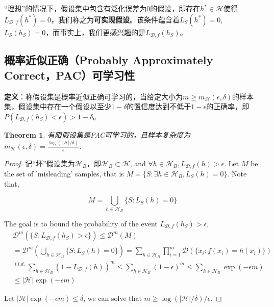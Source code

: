 \documentclass{article}
\newtheorem{theorem}{Theorem}
\newtheorem*{proof}{Proof}
\begin{document}
	“理想”的情况下，假设集中包含有泛化误差为0的假设，即存在$h^*\in\mathcal{H}$使得$L_{\mathcal{D},f}(h^*) = 0$，我们称之为\textbf{可实现假设}。该条件蕴含着$L_S(h^*)=0$, $L_S(h_S)=0$，而事实上，我们更感兴趣的是$L_{\mathcal{D},f}(h_S)$。

\subsection{概率近似正确（Probably Approximately Correct，PAC）可学习性}
	\textbf{定义}：称假设集是概率近似正确可学习的，当给定大小为$m\geq m_\mathcal{H}(\epsilon,\delta)$的样本集，假设集中存在一个假设以至少$1-\delta$的置信度达到不低于$1-\epsilon$的正确率，即$P(L_{\mathcal{D},f}(h_S) < \epsilon) > 1-\delta$。
	
	\begin{theorem} 有限假设集是PAC可学习的，且样本复杂度为$m_\mathcal{H}(\epsilon,\delta)=\frac{\log(|\mathcal{H}|/\delta)}{\epsilon}$.
	\end{theorem}
	
	\begin{proof}
	记“坏”假设集为$\mathcal{H}_B$，即$\mathcal{H}_B\subset\mathcal{H}$, and $\forall h\in\mathcal{H}_B,L_{\mathcal{D},f}(h)>\epsilon$. Let $M$ be the set of 'misleading' samples, that is $M=\{S:\exists h\in \mathcal{H}_B, L_S(h)=0\}$. Note that, 
	
	\begin{equation*}
	M=\bigcup\limits_{h\in\mathcal{H}_B}\{S:L_S(h)=0\}
	\end{equation*}
	
	The goal is to bound the probability of the event $L_{\mathcal{D},f}(h_S)>\epsilon$,
	\begin{equation*}
	\begin{split}
	&\mathcal{D}^m(\{S:L_{\mathcal{D},f}(h_S)>\epsilon\})\leq\mathcal{D}^m(M) \\
	&=\mathcal{D}^m(\bigcup\limits_{h\in\mathcal{H}_B}\{S:L_S(h)=0\})         
	=\sum_{h\in\mathcal{H}_B}\prod_{i=1}^m\mathcal{D}(\{x_i:f(x_i)=h(x_i)\})  \\
	&\overset{i.i.d.}{=}\sum_{h\in\mathcal{H}_B}(1-L_{\mathcal{D},f}(h))^m   
	\leq\sum_{h\in\mathcal{H}_B}(1-\epsilon)^m\leq\sum_{h\in\mathcal{H}_B}\exp(-\epsilon m) \\
	&\leq|\mathcal{H}|\exp(-\epsilon m)
	\end{split}
	\end{equation*}

	Let $|\mathcal{H}|\exp(-\epsilon m)\leq\delta$, we can solve that $m\geq\log(|\mathcal{H}|/\delta)/\epsilon$.
	\end{proof}
\end{document}
